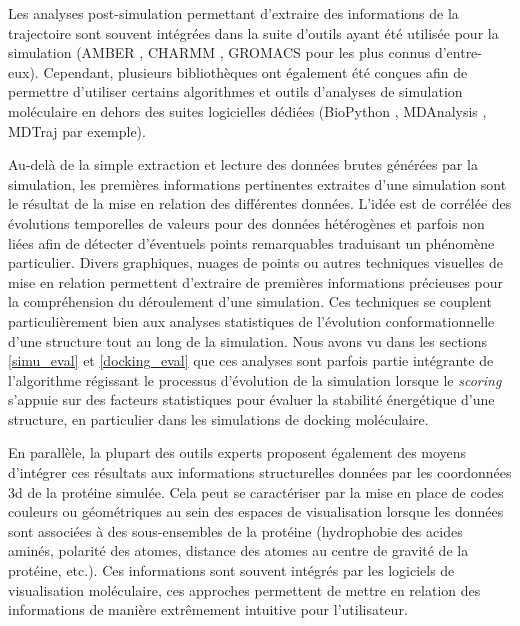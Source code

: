 Les analyses post-simulation permettant d'extraire des informations de la trajectoire sont souvent intégrées dans la suite d'outils ayant été utilisée pour la simulation (AMBER \cite{pearlman1995amber}, CHARMM \cite{brooks2009charmm}, GROMACS \cite{pronk2013gromacs} pour les plus connus d'entre-eux). Cependant, plusieurs bibliothèques ont également été conçues afin de permettre d'utiliser certains algorithmes et outils d'analyses de simulation moléculaire en dehors des suites logicielles dédiées (BioPython \cite{cock_biopython:_2009}, MDAnalysis \cite{michaud-agrawal_mdanalysis:_2011}, MDTraj \cite{McGibbon2014MDTraj} par exemple).

Au-delà de la simple extraction et lecture des données brutes générées par la simulation, les premières informations pertinentes extraites d'une simulation sont le résultat de la mise en relation des différentes données. L'idée est de corrélée des évolutions temporelles de valeurs pour des données hétérogènes et parfois non liées afin de détecter d'éventuels points remarquables traduisant un phénomène particulier. Divers graphiques, nuages de points ou autres techniques visuelles de mise en relation permettent d'extraire de premières informations précieuses pour la compréhension du déroulement d'une simulation. Ces techniques se couplent particulièrement bien aux analyses statistiques de l'évolution conformationnelle d'une structure tout au long de la simulation. Nous avons vu dans les sections \ref{simu_eval} et \ref{docking_eval} que ces analyses sont parfois partie intégrante de l'algorithme régissant le processus d'évolution de la simulation lorsque le \textit{scoring} s'appuie sur des facteurs statistiques pour évaluer la stabilité énergétique d'une structure, en particulier dans les simulations de docking moléculaire.

En parallèle, la plupart des outils experts proposent également des moyens d'intégrer ces résultats aux informations structurelles données par les coordonnées 3d de la protéine simulée. Cela peut se caractériser par la mise en place de codes couleurs ou géométriques au sein des espaces de visualisation lorsque les données sont associées à des sous-ensembles de la protéine (hydrophobie des acides aminés, polarité des atomes, distance des atomes au centre de gravité de la protéine, etc.). Ces informations sont souvent intégrés par les logiciels de visualisation moléculaire, ces approches permettent de mettre en relation des informations de manière extrêmement intuitive pour l'utilisateur.

